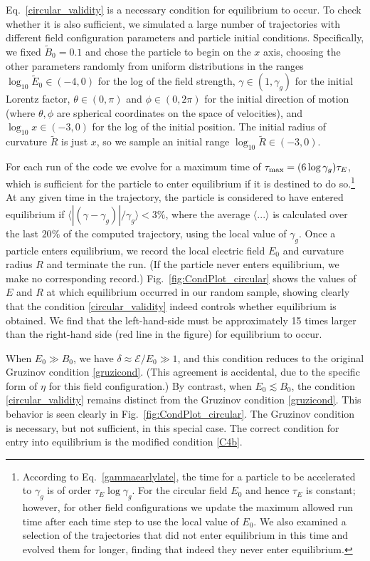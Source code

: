 \documentclass[amsmath,amssymb,nofootinbib,notitlepage,superscriptaddress,twocolumn]{revtex4-2}
\begin{document}
Eq.~\eqref{circular_validity} is a necessary condition for equilibrium to occur.  To check whether it is also sufficient, we simulated a large number of trajectories with different field configuration parameters and particle initial conditions.  Specifically, we fixed $\tilde{B}_0=0.1$ and chose the particle to begin on the $x$ axis, choosing the other parameters randomly from uniform distributions in the ranges $\log_{10} \tilde{E}_0 \in (-4,0)$ for the log of the field strength,  $\gamma \in (1,\gamma_g)$ for the initial Lorentz factor, $\theta\in(0,\pi)$ and $\phi\in(0,2\pi)$ for the initial direction of motion (where $\theta,\phi$ are spherical coordinates on the space of velocities), and $\log_{10} x \in (-3,0)$ for the log of the initial position.  The initial radius of curvature $\tilde{R}$ is just $x$, so we sample an initial range $\log_{10} \tilde{R} \in (-3,0)$. 

For each run of the code we evolve for a maximum time of $\tau_{\rm max}=(6 \log \gamma_g )\tau_E$, which is sufficient for the particle to enter equilibrium if it is destined to do so.\footnote{According to Eq.~\eqref{gammaearlylate}, the time for a particle to be accelerated to $\gamma_g$ is of order $\tau_E \log \gamma_g$.  For the circular field $E_0$ and hence $\tau_E$ is constant; however, for other field configurations we update the maximum allowed run time after each time step to use the local value of $E_0$.  We also examined a selection of the trajectories that did not enter equilibrium in this time and evolved them for longer, finding that indeed they never enter equilibrium.}  At any given time in the trajectory, the particle is considered to have entered equilibrium if $\langle |(\gamma-\gamma_g)|/\gamma_g\rangle<3\%$, where the average $\langle ... \rangle$ is calculated over the last $20\%$ of the computed trajectory, using the local value of $\gamma_g$.  Once a particle enters equilibrium, we record the local electric field $E_0$ and curvature radius $R$ and terminate the run.  (If the particle never enters equilibrium, we make no corresponding record.)  Fig.~\ref{fig:CondPlot_circular} shows the values of $E$ and $R$ at which equilibrium occurred in our random sample, showing clearly that the condition \eqref{circular_validity} indeed controls whether equilibrium is obtained.  We find that the left-hand-side must be approximately 15 times larger than the right-hand side (red line in the figure) for equilibrium to occur.

When $E_0 \gg B_0$, we have $\delta \approx \mathcal{E}/E_0 \gg 1$, and this condition reduces to the original Gruzinov condition \eqref{gruzicond}.  (This agreement is accidental, due to the specific form of $\eta$ for this field configuration.)  By contrast, when $E_0 \lesssim B_0$, the condition \eqref{circular_validity} remains distinct from the Gruzinov condition \eqref{gruzicond}.  This behavior is seen clearly in Fig.~\ref{fig:CondPlot_circular}.  The Gruzinov condition is necessary, but not sufficient, in this special case.  The correct condition for entry into equilibrium is the modified condition \eqref{C4b}.
\end{document}

